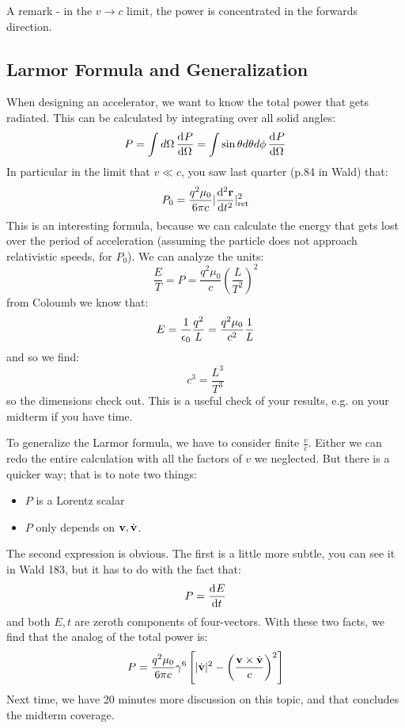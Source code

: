 A remark - in the $v \to c$ limit, the power is concentrated in the forwards direction.


\subsection{Larmor Formula and Generalization}
When designing an accelerator, we want to know the total power that gets radiated. This can be calculated by integrating over all solid angles:
\begin{equation}
    P = \int d\Omega \dod{P}{\Omega} = \int \sin\theta d\theta d\phi \dod{P}{\Omega}
\end{equation}
In particular in the limit that $v \ll c$, you saw last quarter (p.84 in Wald) that:
\begin{equation}
    P_0 =  \frac{q^2\mu_0}{6\pi c}\abs{\dod[2]{\v{r}}{t}}^2_{\text{ret}}
\end{equation}
This is an interesting formula, because we can calculate the energy that gets lost over the period of acceleration (assuming the particle does not approach relativistic speeds, for $P_0$). We can analyze the units:
\begin{equation}
    \frac{E}{T} = P = \frac{q^2 \mu_0}{c}\left(\frac{L}{T^2}\right)^2
\end{equation}
from Coloumb we know that:
\begin{equation}
    E = \frac{1}{\epsilon_0}\frac{q^2}{L} = \frac{q^2\mu_0}{c^2}\frac{1}{L}
\end{equation}
and so we find:
\begin{equation}
    c^3 = \frac{L^3}{T^3}
\end{equation}
so the dimensions check out. This is a useful check of your results, e.g. on your midterm if you have time.

To generalize the Larmor formula, we have to consider finite $\frac{v}{c}$. Either we can redo the entire calculation with all the factors of $v$ we neglected. But there is a quicker way; that is to note two things:
\begin{itemize}
    \item $P$ is a Lorentz scalar
    \item $P$ only depends on $\mathbf{v}, \dot{\mathbf{v}}$.
\end{itemize}
The second expression is obvious. The first is a little more subtle, you can see it in Wald 183, but it has to do with the fact that:
\begin{equation}
    P = \dod{E}{t}
\end{equation}
and both $E, t$ are zeroth components of four-vectors. With these two facts, we find that the analog of the total power is:
\begin{equation}
    P = \frac{q^2\mu_0}{6\pi c}\gamma^6\left[\lvert \dot{\mathbf{v}} \rvert^2 - \left(\frac{\mathbf{v} \times \dot{\mathbf{v}}}{c}\right)^2\right]
\end{equation}
Next time, we have 20 minutes more discussion on this topic, and that concludes the midterm coverage.